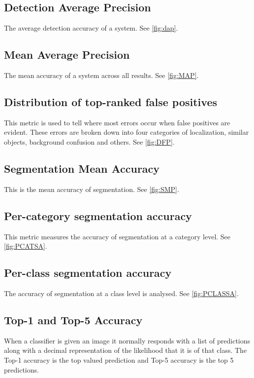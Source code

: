 \subsection*{Detection Average Precision}
The average detection accuracy of a system. See \ref{fig:dap}.

\subsection*{Mean Average Precision}
The mean accuracy of a system across all results. See \ref{fig:MAP}.
		
\subsection*{Distribution of top-ranked false positives}
This metric is used to tell where most errors occur when false positives are
evident. These errors are broken down into four categories of localization,
similar objects, background confusion and others. See \ref{fig:DFP}.

\subsection*{Segmentation Mean Accuracy}
This is the mean accuracy of segmentation. See \ref{fig:SMP}.

\subsection*{Per-category segmentation accuracy}
This metric measures the accuracy of segmentation at a category level. See \ref{fig:PCATSA}.	

\subsection*{Per-class segmentation accuracy}
The accuracy of segmentation at a class level is analysed. See \ref{fig:PCLASSA}.

\subsection*{Top-1 and Top-5 Accuracy}
When a classifier is given an image it normally responds with a list of
predictions along with a decimal representation of the likelihood that it is of
that class. The Top-1 accuracy is the top valued prediction and Top-5 accuracy
is the top 5 predictions.
		
